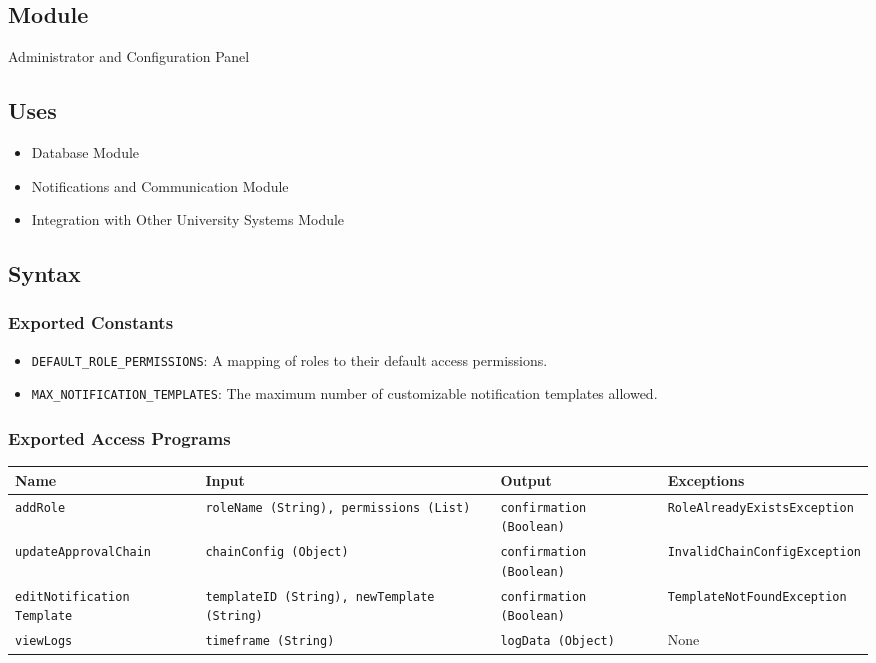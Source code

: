 \documentclass[12pt, titlepage]{article}
\begin{document}
\subsection{Module}
Administrator and Configuration Panel

\subsection{Uses}
\begin{itemize}
    \item Database Module
    \item Notifications and Communication Module
    \item Integration with Other University Systems Module
\end{itemize}

\subsection{Syntax}

\subsubsection{Exported Constants}
\begin{itemize}
    \item \texttt{DEFAULT\_ROLE\_PERMISSIONS}: A mapping of roles to their default access permissions.
    \item \texttt{MAX\_NOTIFICATION\_TEMPLATES}: The maximum number of customizable notification templates allowed.
\end{itemize}

\subsubsection{Exported Access Programs}
\begin{center}
    \scriptsize
    \begin{tabular}{|p{3cm}|p{4cm}|p{4cm}|p{4cm}|}
        \hline
        \textbf{Name} & \textbf{Input} & \textbf{Output} & \textbf{Exceptions} \\
        \hline
        \texttt{addRole} & \texttt{roleName (String), permissions (List)} & \texttt{confirmation (Boolean)} & \texttt{RoleAlreadyExistsException} \\
        \hline
        \texttt{updateApprovalChain} & \texttt{chainConfig (Object)} & \texttt{confirmation (Boolean)} & \texttt{InvalidChainConfigException} \\
        \hline
        \texttt{editNotification \newline Template} & \texttt{templateID (String), newTemplate (String)} & \texttt{confirmation (Boolean)} & \texttt{TemplateNotFoundException} \\
        \hline
        \texttt{viewLogs} & \texttt{timeframe (String)} & \texttt{logData (Object)} & None \\
        \hline
    \end{tabular}
\end{center}
\end{document}
